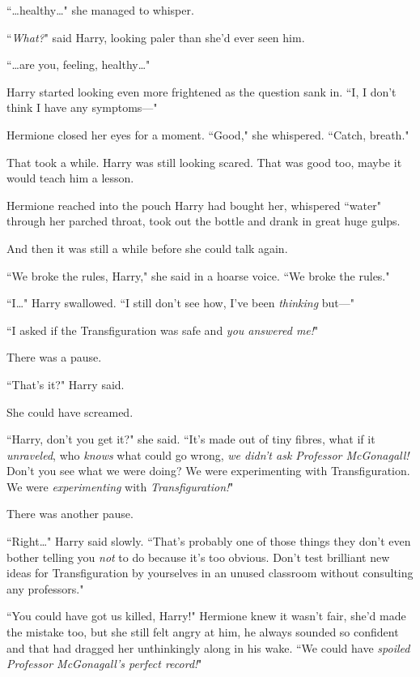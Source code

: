 ``{\ldots}healthy{\ldots}" she managed to whisper.

``\emph{What?}" said Harry, looking paler than she'd ever seen him.

``{\ldots}are you, feeling, healthy{\ldots}"

Harry started looking even more frightened as the question sank in. ``I, I don't think I have any symptoms—"

Hermione closed her eyes for a moment. ``Good," she whispered. ``Catch, breath."

That took a while. Harry was still looking scared. That was good too, maybe it would teach him a lesson.

Hermione reached into the pouch Harry had bought her, whispered ``water" through her parched throat, took out the bottle and drank in great huge gulps.

And then it was still a while before she could talk again.

``We broke the rules, Harry," she said in a hoarse voice. ``We broke the rules."

``I{\ldots}" Harry swallowed. ``I still don't see how, I've been \emph{thinking} but—"

``I asked if the Transfiguration was safe and \emph{you answered me!}"

There was a pause.

``That's it?" Harry said.

She could have screamed.

``Harry, don't you get it?" she said. ``It's made out of tiny fibres, what if it \emph{unraveled}, who \emph{knows} what could go wrong, \emph{we didn't ask Professor McGonagall!} Don't you see what we were doing? We were experimenting with Transfiguration. We were \emph{experimenting} with \emph{Transfiguration!}"

There was another pause.

``Right{\ldots}" Harry said slowly. ``That's probably one of those things they don't even bother telling you \emph{not} to do because it's too obvious. Don't test brilliant new ideas for Transfiguration by yourselves in an unused classroom without consulting any professors."

``You could have got us killed, Harry!" Hermione knew it wasn't fair, she'd made the mistake too, but she still felt angry at him, he always sounded so confident and that had dragged her unthinkingly along in his wake. ``We could have \emph{spoiled Professor McGonagall's perfect record!}"

